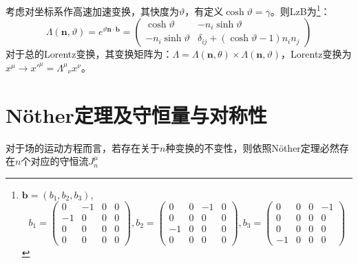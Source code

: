 考虑对坐标系作高速加速变换，其快度为$\vartheta$，有定义$\cosh\vartheta=\gamma$。则\gls{LzB}为\footnote{$\boldsymbol{b}=(b_1,b_2,b_3)$,\[b_1=\begin{pmatrix}
	0&	-1&	0&	0\\
	-1&	0&	0&	0\\
	0&	0&	0&	0\\
	0&	0&	0&	0
	\end{pmatrix},b_2=\begin{pmatrix}
	0&0&-1&0\\
	0&0&0&0\\
	-1&0&0&0\\
	0&0&0&0
	\end{pmatrix},b_3=\begin{pmatrix}
	0&0&0&-1\\
	0&0&0&0\\
	0&0&0&0\\
	-1&0&0&0
	\end{pmatrix}\]}：
\begin{equation}
	\Lambda(\boldsymbol{n},\vartheta)=e^{\vartheta\boldsymbol{n}\cdot\boldsymbol{b}}
	=\begin{pmatrix}
		\cosh\vartheta&	-n_i\sinh\vartheta\\
		-n_i\sinh\vartheta&	\delta_{ij}+(\cosh\vartheta-1)n_in_j	
	\end{pmatrix}
\end{equation}
\normalsize
对于总的Lorentz变换，其变换矩阵为：$\Lambda=\Lambda(\boldsymbol{n},\theta)\times\Lambda(\boldsymbol{n},\vartheta)$，Lorentz变换为$x^\mu\rightarrow x'^\mu={\Lambda^\mu}_\nu x^\nu$。

\section{N\"other定理及守恒量与对称性}
对于场的运动方程而言，若存在关于$n$种变换的不变性，则依照N\"other定理必然存在$n$个对应的守恒流$J^\mu_n$

